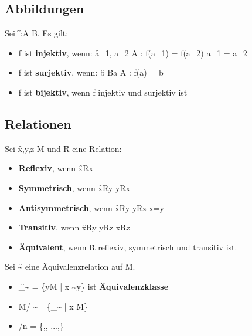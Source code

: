 
\subsection*{Abbildungen}
Sei \f{f:A \rightarrow B}. Es gilt:
\begin{itemize}
    \item f ist \textbf{injektiv}, wenn: \f{\forall a_1, a_2 \in A : f(a_1) = f(a_2) \Rightarrow a_1 = a_2}
    \item f ist \textbf{surjektiv}, wenn: \f{\forall b \in B\quad  \exists a \in A : f(a) = b}
    \item f ist \textbf{bijektiv}, wenn f injektiv und surjektiv ist
\end{itemize}

\subsection*{Relationen}
Sei \f{x,y,z \in M} und \f{R} eine Relation:
\begin{itemize}
    \item \textbf{Reflexiv}, wenn \f{xRx}
    \item \textbf{Symmetrisch}, wenn \f{xRy \Leftrightarrow yRx}
    \item \textbf{Antisymmetrisch}, wenn \f{xRy \wedge yRz \Rightarrow x=y}
    \item \textbf{Transitiv}, wenn \f{xRy \wedge yRz \Rightarrow xRz}
    \item \textbf{Äquivalent}, wenn \f{R} reflexiv, symmetrisch und transitiv ist.\\
\end{itemize}
Sei \f{\sim } eine Äquivalenzrelation auf \f{M}.
\begin{itemize}
    \item \f{\left[x\right] _{\sim} = \left\{y\in M | x \sim y\right\}} ist \textbf{Äquivalenzklasse}
    \item \f{M/ \sim = \left\{\left[x\right] _{\sim} | x \in M\right\} }
    \item \f{ /n = \left\{\left[0\right],\left[1\right], ...,\left[n-1\right] \right\}}
\end{itemize}